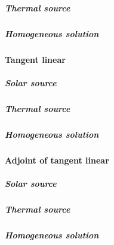 \subparagraph{Thermal source}
\label{sec:source_function_integration-local_source_greens_function-downward-forward-thermal_source}

\subparagraph{Homogeneous solution}
\label{sec:source_function_integration-local_source_greens_function-downward-forward-homogeneous_solution}


%
\paragraph{Tangent linear}
\label{sec:source_function_integration-local_source_greens_function-downward-tangent_linear}

\subparagraph{Solar source}
\label{sec:source_function_integration-local_source_greens_function-downward-tanget_linear-solar_source}

\subparagraph{Thermal source}
\label{sec:source_function_integration-local_source_greens_function-downward-tanget_linear-thermal_source}

\subparagraph{Homogeneous solution}
\label{sec:source_function_integration-local_source_greens_function-downward-tanget_linear-homogeneous_solution}



%
\paragraph{Adjoint of tangent linear}
\label{sec:source_function_integration-local_source_greens_function-downward-adjoint_of_tangent_linear}

\subparagraph{Solar source}
\label{sec:source_function_integration-local_source_greens_function-downward-adjoint_of_tanget_linear-solar_source}

\subparagraph{Thermal source}
\label{sec:source_function_integration-local_source_greens_function-downward-adjoint_of_tanget_linear-thermal_source}

\subparagraph{Homogeneous solution}
\label{sec:source_function_integration-local_source_greens_function-downward-adjoint_of_tanget_linear-homogeneous_solution}
